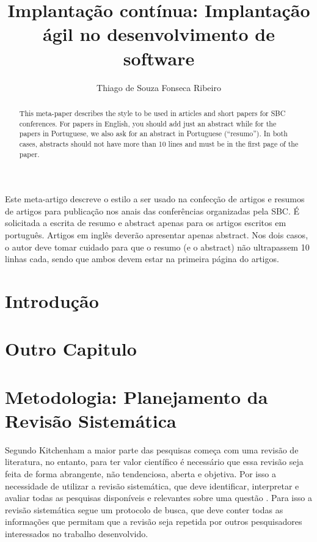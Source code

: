 \documentclass[12pt]{article}
\title{Implantação contínua: Implantação ágil no desenvolvimento de software}
\author{Thiago  de Souza Fonseca Ribeiro\inst{1}}
\begin{document}
\maketitle

\begin{abstract}
  This meta-paper describes the style to be used in articles and short papers
  for SBC conferences. For papers in English, you should add just an abstract
  while for the papers in Portuguese, we also ask for an abstract in
  Portuguese (``resumo''). In both cases, abstracts should not have more than
  10 lines and must be in the first page of the paper.
\end{abstract}

\begin{resumo}
  Este meta-artigo descreve o estilo a ser usado na confecção de artigos e
  resumos de artigos para publicação nos anais das conferências organizadas
  pela SBC. É solicitada a escrita de resumo e abstract apenas para os artigos
  escritos em português. Artigos em inglês deverão apresentar apenas abstract.
  Nos dois casos, o autor deve tomar cuidado para que o resumo (e o abstract)
  não ultrapassem 10 linhas cada, sendo que ambos devem estar na primeira
  página do artigos.
\end{resumo}

\section{Introdução}\label{sec1}

\section{Outro Capitulo} \label{sec2}

\section{Metodologia: Planejamento da Revisão Sistemática} \label{sec3}

Segundo Kitchenham \cite{kitchenham2004procedures} a maior parte das pesquisas começa com uma revisão de literatura, no entanto, para ter valor científico é necessário que essa revisão seja feita de forma abrangente, não tendenciosa, aberta e objetiva. Por isso a necessidade de utilizar a revisão sistemática, que deve identificar, interpretar e avaliar todas as pesquisas disponíveis e relevantes sobre uma questão \cite{keele2007guidelines}. Para isso a revisão sistemática segue um protocolo de busca, que deve conter todas as informações que permitam que a revisão seja repetida por outros pesquisadores interessados no trabalho desenvolvido.
\end{document}
